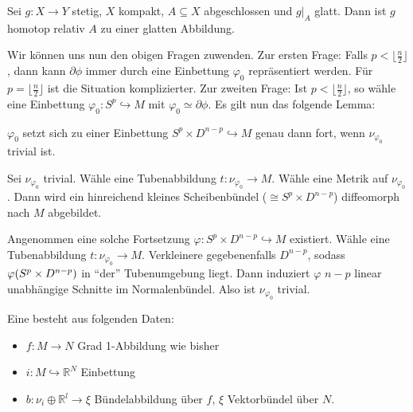 \begin{satz}[{name={Glatte Approximation}}]
	Sei $g \colon X \to Y$ stetig, $X$ kompakt, $A \subseteq X$ abgeschlossen und $g|_A$ glatt.
	Dann ist $g$ homotop relativ $A$ zu einer glatten Abbildung.
\end{satz}

Wir können uns nun den obigen Fragen zuwenden. Zur ersten Frage:
Falls $p < \lfloor \frac{n}{2}\rfloor$, dann kann $\partial \phi$ immer durch eine Einbettung $\varphi_0$ repräsentiert werden.
Für $p = \lfloor \frac{n}{2}\rfloor$ ist die Situation komplizierter.
Zur zweiten Frage: Ist $p < \lfloor \frac{n}{2}\rfloor$, so wähle eine Einbettung $\varphi_0 \colon S^p \hookrightarrow M$ mit $\varphi_0 \simeq \partial \phi$.
Es gilt nun das folgende Lemma:

\begin{lemma}
	$\varphi_0$ setzt sich zu einer Einbettung $S^p \times D^{n-p} \hookrightarrow M$ genau dann fort, wenn $\nu_{\varphi_0}$ trivial ist.
\end{lemma}
\begin{beweis}
	Sei $\nu_{\varphi_0}$ trivial.
	Wähle eine Tubenabbildung $t \colon \nu_{\varphi_0} \to M$.
	Wähle eine Metrik auf $\nu_{\varphi_0}$.
	Dann wird ein hinreichend kleines Scheibenbündel ($\cong S^p \times D^{n-p}$) diffeomorph nach $M$ abgebildet.
	
	Angenommen eine solche Fortsetzung $\varphi \colon S^p \times D^{n-p} \hookrightarrow M$ existiert.
	Wähle eine Tubenabbildung $t \colon \nu_{\varphi_0} \to M$.
	Verkleinere gegebenenfalls $D^{n-p}$, sodass $\varphi \enbrace*{S^p \times D^{n-p}}$ in \enquote{der} Tubenumgebung liegt.
	Dann induziert $\varphi$ $n-p$ linear unabhängige Schnitte im Normalenbündel.
	Also ist $\nu_{\varphi_0}$ trivial.
\end{beweis}

\begin{definition}
	Eine  besteht aus folgenden Daten:
	\begin{itemize}[itemsep=1pt]
		\item $f \colon M \to N$ Grad 1-Abbildung wie bisher
		\item $i \colon M \hookrightarrow \mathbb{R}^N$ Einbettung
		\item $b \colon \nu_i \oplus \mathbb{R}^l \to \xi$ Bündelabbildung über $f$, $\xi$ Vektorbündel über $N$.
	\end{itemize} 
\end{definition}

